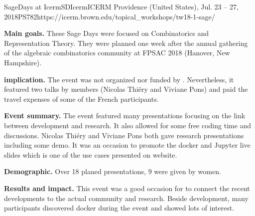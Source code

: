 \begin{event}{SageDays at Icerm}{SDIcerm}{ICERM Providence (United States), Jul. 23 -- 27, 2018}{PS}{78}{2}{https://icerm.brown.edu/topical_workshops/tw18-1-sage/}

\textbf{Main goals.} These Sage Days were focused on Combinatorics and Representation Theory. They were planned one week after the annual gathering of the algebraic combinatorics community at FPSAC 2018 (Hanover, New Hampshire).

\textbf{\ODK implication.} The event was not organized nor funded by \ODK. Nevertheless, it featured two talks by \ODK members (Nicolas Thiéry and Viviane Pons) and \ODK paid the travel expenses of some of the French participants.

\textbf{Event summary.} The event featured many presentations focusing on the link between \Sage development and research. It also allowed for some free coding time and discussions. Nicolas Thiéry and Viviane Pons both gave research presentations including some \Sage demo. It was an occasion to promote the \Sage docker and Jupyter live slides which is one of the use cases presented on \ODK website.

\textbf{Demographic.} Over 18 planed presentations, 9 were given by women.

\textbf{Results and impact.} This event was a good occasion for \ODK to connect the recent developments to the actual community and research. Beside \Sage development, many participants discovered docker during the event and showed lots of interest.

\end{event}

